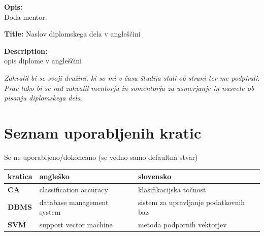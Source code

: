 \documentclass[a4paper,12pt,openright]{book}
\newcommand{\clearemptydoublepage}{\newpage{\pagestyle{empty}\cleardoublepage}}
\begin{document}
\bigskip
\noindent\textbf{Opis:}\\
Doda mentor.

\bigskip
\noindent\textbf{Title:} Naslov diplomskega dela v angleščini

\bigskip
\noindent\textbf{Description:}\\
opis diplome v angleščini

\vfill



\vspace{2cm}

\clearemptydoublepage

\thispagestyle{empty}\mbox{}\vfill\null\it%
\noindent
Zahvalil bi se svoji družini, ki so mi v času študija stali ob strani ter me podpirali.
Prav tako bi se rad zahvalil mentorju in somentorju za usmerjanje in nasvete ob pisanju diplomskega dela. 
\rm\normalfont

\clearemptydoublepage

\pagestyle{empty}
\def\thepage{}%
\tableofcontents{}


\clearemptydoublepage


\chapter*{Seznam uporabljenih kratic}
Se ne uporabljeno/dokoncano (se vedno samo defaultna stvar) \newline
\noindent\begin{tabular}{p{}|p{}|p{}}    %
  {\bf kratica} & {\bf angleško}                              & {\bf slovensko} \\ \hline
  {\bf CA}      & classification accuracy               & klasifikacijska točnost \\
  {\bf DBMS} & database management system & sistem za upravljanje podatkovnih baz \\
  {\bf SVM}   & support vector machine              & metoda podpornih vektorjev \\
\end{tabular}


\clearemptydoublepage
\end{document}
